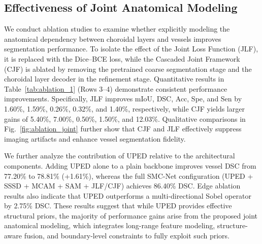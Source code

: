 \documentclass[lettersize,journal]{IEEEtran}
\begin{document}
\begin{table}[!h]
\renewcommand{\arraystretch}{1.2}
\centering
\caption{Ablation results ($mean \pm std$) on the OCT-CCV dataset for choroidal vessel segmentation with SMC-Net-S. Best results are shown in \textbf{bold}.}
\label{tab:ablation_1}
\end{table}

\subsection{Effectiveness of Joint Anatomical Modeling}
{\color{red}
We conduct ablation studies to examine whether explicitly modeling the anatomical dependency between choroidal layers and vessels improves segmentation performance.
To isolate the effect of the Joint Loss Function (JLF), it is replaced with the Dice--BCE loss, while the Cascaded Joint Framework (CJF) is ablated by removing the pretrained coarse segmentation stage and the choroidal layer decoder in the refinement stage.
Quantitative results in Table~\ref{tab:ablation_1} (Rows 3--4) demonstrate consistent performance improvements.
Specifically, JLF improves mIoU, DSC, Acc, Spe, and Sen by 1.60\%, 1.59\%, 0.26\%, 0.32\%, and 1.40\%, respectively, while CJF yields larger gains of 5.40\%, 7.00\%, 0.50\%, 1.50\%, and 12.03\%.
Qualitative comparisons in Fig.~\ref{fig:ablation_joint} further show that CJF and JLF effectively suppress imaging artifacts and enhance vessel segmentation fidelity.

We further analyze the contribution of UPED relative to the architectural components.
Adding UPED alone to a plain backbone improves vessel DSC from 77.20\% to 78.81\% (+1.61\%), whereas the full SMC-Net configuration (UPED + SSSD + MCAM + SAM + JLF/CJF) achieves 86.40\% DSC.
Edge ablation results also indicate that UPED outperforms a multi-directional Sobel operator by 2.75\% DSC.
These results suggest that while UPED provides effective structural priors, the majority of performance gains arise from the proposed joint anatomical modeling, which integrates long-range feature modeling, structure-aware fusion, and boundary-level constraints to fully exploit such priors.
}
\end{document}
